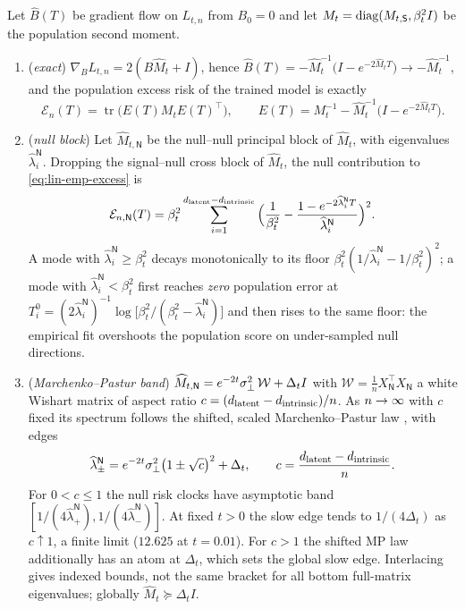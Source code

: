 \begin{proposition}\label{prop:lin-emp}
Let $\widehat B(T)$ be gradient flow on $L_{t,n}$ from $B_0=0$ and let $M_t=\operatorname{diag}(M_{t,\mathsf S},\beta_t^2I)$ be the population second moment.
\begin{enumerate}
\item[(a)] (\emph{exact}) $\nabla_BL_{t,n}=2(B\widehat M_t+I)$, hence $\widehat B(T)=-\widehat M_t^{-1}\big(I-e^{-2\widehat M_tT}\big)\to-\widehat M_t^{-1}$, and the population excess risk of the trained model is exactly
\begin{equation}\label{eq:lin-emp-excess}
\mathcal E_n(T)=\operatorname{tr}\big(E(T)M_tE(T)^{\top}\big),\qquad E(T)=M_t^{-1}-\widehat M_t^{-1}\big(I-e^{-2\widehat M_tT}\big).
\end{equation}
\item[(b)] (\emph{null block}) Let $\widehat M_{t,\mathsf N}$ be the null--null principal block of $\widehat M_t$, with eigenvalues $\widehat\lambda^{\mathsf N}_i$. Dropping the signal--null cross block of $\widehat M_t$, the null contribution to \eqref{eq:lin-emp-excess} is
\begin{equation}\label{eq:lin-emp-null}
\mathcal E_{n,\mathsf N}(T)=\beta_t^2\sum_{i=1}^{d_{\mathrm{latent}}-d_{\mathrm{intrinsic}}}\Big(\frac1{\beta_t^2}-\frac{1-e^{-2\widehat\lambda^{\mathsf N}_iT}}{\widehat\lambda^{\mathsf N}_i}\Big)^2 .
\end{equation}
A mode with $\widehat\lambda^{\mathsf N}_i\ge\beta_t^2$ decays monotonically to its floor $\beta_t^2(1/\widehat\lambda^{\mathsf N}_i-1/\beta_t^2)^2$; a mode with $\widehat\lambda^{\mathsf N}_i<\beta_t^2$ first reaches \emph{zero} population error at $T^0_i=(2\widehat\lambda^{\mathsf N}_i)^{-1}\log\big[\beta_t^2/(\beta_t^2-\widehat\lambda^{\mathsf N}_i)\big]$ and then rises to the same floor: the empirical fit overshoots the population score on under-sampled null directions.
\item[(c)] (\emph{Marchenko--Pastur band}) $\widehat M_{t,\mathsf N}=e^{-2t}\sigma_{\perp}^2\,\mathcal W+\Delta_tI$ with $\mathcal W=\frac1n X_{\mathsf N}^{\top}X_{\mathsf N}$ a white Wishart matrix of aspect ratio $c=(d_{\mathrm{latent}}-d_{\mathrm{intrinsic}})/n$. As $n\to\infty$ with $c$ fixed its spectrum follows the shifted, scaled Marchenko--Pastur law \citep{marchenko1967distribution,couillet2011rmt}, with edges
\begin{equation}\label{eq:lin-mp-edges}
\widehat\lambda^{\mathsf N}_\pm=e^{-2t}\sigma_{\perp}^2\big(1\pm\sqrt{c}\big)^2+\Delta_t,\qquad c=\frac{d_{\mathrm{latent}}-d_{\mathrm{intrinsic}}}{n}.
\end{equation}
For $0<c\le1$ the null risk clocks have asymptotic band $[1/(4\widehat\lambda^{\mathsf N}_+),1/(4\widehat\lambda^{\mathsf N}_-)]$. At fixed $t>0$ the slow edge tends to $1/(4\Delta_t)$ as $c\uparrow1$, a finite limit ($12.625$ at $t=0.01$). For $c>1$ the shifted MP law additionally has an atom at $\Delta_t$, which sets the global slow edge. Interlacing gives indexed bounds, not the same bracket for all bottom full-matrix eigenvalues; globally $\widehat M_t\succeq\Delta_tI$.


\end{enumerate}
\end{proposition}

